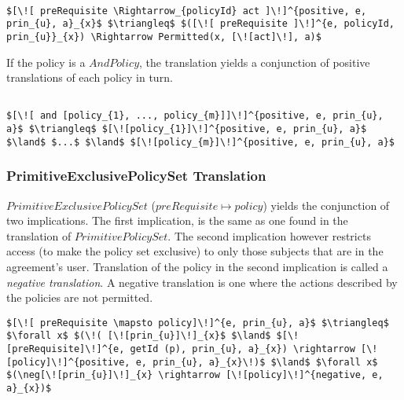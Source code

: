 \lstset{mathescape, language=AST} 
\begin{lstlisting}[frame=single, caption={Positive Policy Translation {$\colon$} Single policy},label={lst:transpolicypositiveSingle}]

$[\![ preRequisite \Rightarrow_{policyId} act ]\!]^{positive, e, prin_{u}, a}_{x}$ $\triangleq$ $([\![ preRequisite ]\!]^{e, policyId, prin_{u}}_{x}) \Rightarrow Permitted(x, [\![act]\!], a)$

\end{lstlisting}


If the policy is a $AndPolicy$, the translation yields a conjunction of positive translations of each policy in turn.

\lstset{mathescape, language=AST}  
\begin{lstlisting}[frame=single, caption={Positive Policy Translation {$\colon$} List of policies},label={lst:transpolicypositiveListOfPolicies}]

$[\![ and [policy_{1}, ..., policy_{m}]]\!]^{positive, e, prin_{u}, a}$ $\triangleq$ $[\![policy_{1}]\!]^{positive, e, prin_{u}, a}$ $\land$ $...$ $\land$ $[\![policy_{m}]\!]^{positive, e, prin_{u}, a}$

\end{lstlisting}


\subsubsection{PrimitiveExclusivePolicySet Translation}
$PrimitiveExclusivePolicySet$ ($preRequisite \mapsto policy$) yields the conjunction of two implications. The first implication, is the same as one found in the translation of $PrimitivePolicySet$. The second implication however restricts access (to make the policy set exclusive) to only those subjects that are in the agreement's user. Translation of the policy in the second implication is called a \emph{negative translation}. A negative translation is one where the actions described by the policies are not permitted. 


\lstset{mathescape, language=AST}  
\begin{lstlisting}[frame=single, caption={Policy Set Translation {$\colon$} PrimitiveExclusivePolicySet},label={lst:transpolicyformulaPrimitiveExclusivePolicySet}]
$[\![ preRequisite \mapsto policy]\!]^{e, prin_{u}, a}$ $\triangleq$ $\forall x$ $(\!( [\![prin_{u}]\!]_{x}$ $\land$ $[\![preRequisite]\!]^{e, getId (p), prin_{u}, a}_{x}) \rightarrow [\![policy]\!]^{positive, e, prin_{u}, a}_{x}\!)$ $\land$ $\forall x$ $(\neg[\![prin_{u}]\!]_{x} \rightarrow [\![policy]\!]^{negative, e, a}_{x})$
\end{lstlisting}


